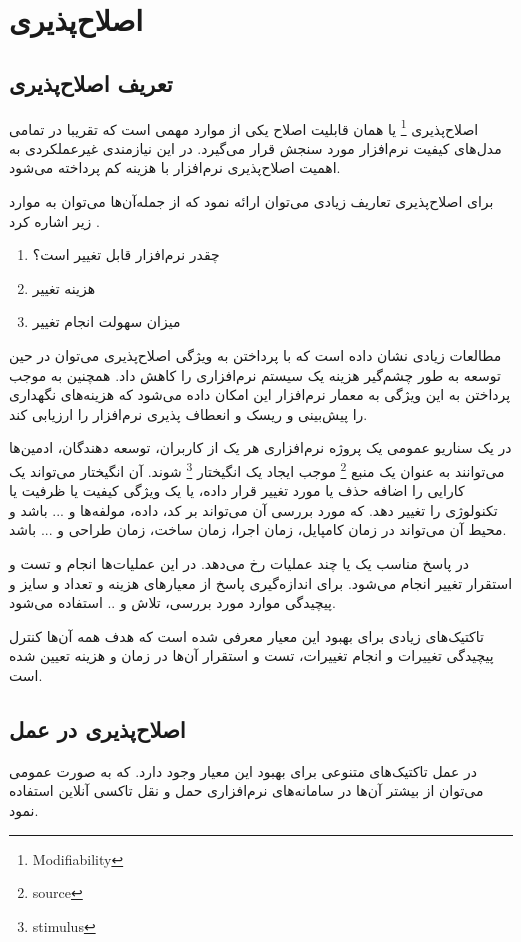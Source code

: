 \chapter{اصلاح‌پذیری}
\section{تعریف اصلاح‌پذیری}
اصلاح‌پذیری
\footnote{Modifiability}
یا همان قابلیت اصلاح یکی از موارد مهمی است که تقریبا در تمامی مدل‌های کیفیت نرم‌افزار مورد سنجش قرار می‌گیرد. در این نیازمندی غیرعملکردی به اهمیت اصلاح‌پذیری نرم‌افزار با هزینه کم پرداخته می‌شود.

برای اصلاح‌پذیری تعاریف زیادی می‌توان ارائه نمود که از جمله‌آن‌ها می‌توان به موارد زیر اشاره کرد \cite{mod:c1-cuibancan-2020}.

\begin{enumerate}
\item
چقدر نرم‌افزار قابل تغییر است؟
\item 
هزینه تغییر 
\item
میزان سهولت انجام تغییر
\end{enumerate}

مطالعات زیادی نشان داده است که با پرداختن به ویژگی اصلاح‌پذیری می‌توان در حین توسعه به طور چشم‌گیر هزینه یک سیستم‌ نرم‌افزاری را کاهش داد.
همچنین به موجب پرداختن به این ویژگی به معمار نرم‌افزار این امکان داده می‌شود که هزینه‌های نگهداری را پیش‌بینی و ریسک و انعطاف پذیری نرم‌افزار را ارزیابی کند.

در یک سناریو عمومی یک پروژه نرم‌افزاری هر یک از کاربران، توسعه دهندگان، ادمین‌ها می‌توانند به عنوان یک منبع 
\footnote{source}
موجب ایجاد
یک انگیختار 
\footnote{stimulus}
شوند. آن انگیختار می‌تواند یک کارایی را اضافه حذف یا مورد تغییر قرار داده، یا یک ویژگی کیفیت یا ظرفیت یا تکنولوژی را تغییر دهد.
که مورد بررسی آن می‌تواند بر کد، داده، مولفه‌ها و ... باشد و محیط آن می‌تواند در زمان کامپایل، زمان اجرا، زمان ساخت، زمان طراحی و ... باشد.

در پاسخ مناسب یک یا چند عملیات رخ می‌دهد. 
در این عملیات‌ها انجام و تست و استقرار تغییر انجام می‌شود.
برای اندازه‌گیری پاسخ از معیار‌‌های هزینه و تعداد و سایز و پیچیدگی موارد مورد بررسی، تلاش و .. استفاده می‌شود.
 
 تاکتیک‌های زیادی برای بهبود این معیار معرفی شده است که هدف همه آن‌ها کنترل پیچیدگی تغییرات و انجام تغییرات، تست و استقرار آن‌ها در زمان و هزینه تعیین شده است.
 
 \section{اصلاح‌پذیری در عمل}
در عمل‌ تاکتیک‌های متنوعی برای بهبود این معیار وجود دارد. که به صورت عمومی می‌توان از بیشتر ‌آن‌ها در سامانه‌های نرم‌افزاری حمل و نقل تاکسی آنلاین استفاده نمود.

